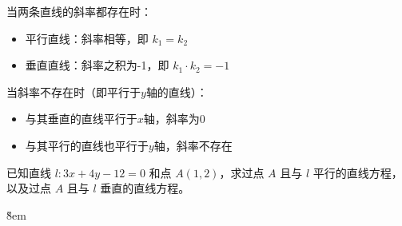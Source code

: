 \begin{theorem}
    \begin{minipage}[c]{0.58\textwidth}
        \begin{tips}
            当两条直线的斜率都存在时：
            \begin{itemize}
                \item 平行直线：斜率相等，即 $k_1 = k_2$
                \item 垂直直线：斜率之积为-1，即 $k_1 \cdot k_2 = -1$
            \end{itemize}
        \end{tips}

        \begin{tips}
            当斜率不存在时（即平行于$y$轴的直线）：
            \begin{itemize}
                \item 与其垂直的直线平行于$x$轴，斜率为0
                \item 与其平行的直线也平行于$y$轴，斜率不存在
            \end{itemize}
        \end{tips}
    \end{minipage}%
    \hfill
    \begin{minipage}[c]{0.4\textwidth}
    \end{minipage}
\end{theorem}

\begin{example}
    已知直线 $l: 3x + 4y - 12 = 0$ 和点 $A(1,2)$，求过点 $A$ 且与 $l$ 平行的直线方程，以及过点 $A$ 且与 $l$ 垂直的直线方程。
\end{example}

\v{8em}
